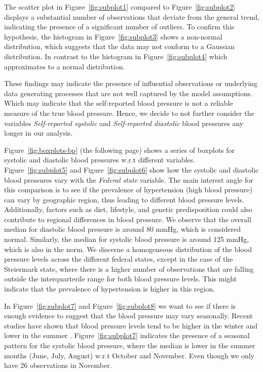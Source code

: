 \documentclass[12 pt]{scrartcl}
\numberwithin{equation}{section}
\begin{document}
The scatter plot in Figure~\ref{fig:subplot1} compared to Figure~\ref{fig:subplot2} displays a substantial number of observations that 
deviate from the general trend, indicating the presence of a significant number of outliers.
To confirm this hypothesis, the histogram in Figure~\ref{fig:subplot3} 
shows a non-normal distribution, which suggests that the data may not conform to a Gaussian distribution. 
In contrast to the histogram in Figure~\ref{fig:subplot4} which approximates to a normal distribution.

These findings may indicate the presence of influential observations or underlying 
data generating processes that are not well captured by the model assumptions. 
Which may indicate that the self-reported blood pressure is not a reliable measure of the true blood pressure.
Hence, we decide to not further consider the variables \textit{Self-reported systolic} and \textit{Self-reported diastolic} blood pressures 
any longer in our analysis.

Figure~\ref{fig:boxplots-bp} (the following page) shows a series of boxplots for systolic and 
diastolic blood pressures w.r.t different variables. 
Figure~\ref{fig:subplot5} and Figure~\ref{fig:subplot6} show how the systolic and diastolic blood pressures vary
with the \textit{Federal state} variable. The main interest angle for this comparison 
is to see if the prevalence of hypertension (high blood pressure) can vary by geographic region, thus
leading to different blood pressure levels. Additionally, factors such as diet, lifestyle, and genetic predisposition 
could also contribute to regional differences in blood pressure. We observe that the overall median for diastolic blood pressure is
around 80 mmHg, which is considered normal. Similarly, the median for systolic blood pressure is around 125 mmHg, 
which is also in the norm. 
We discerne a homogeneous distribution of the blood pressure levels across the different federal states, 
except in the case of the Steiermark state, where there is a higher number of observations that are falling outside the interquarterile range
for both blood pressure levels. This might indicate that the prevalence of hypertension is higher in this region.

In Figure~\ref{fig:subplot7} and Figure~\ref{fig:subplot8} we want to see if there is enough evidence
to suggest that the blood pressure may vary seasonally. Recent studies have shown that blood pressure levels
tend to be higher in the winter and lower in the summer \citep{flint2019effect}.
Figure~\ref{fig:subplot7} indicates the presence of a seasonal pattern for the systolic blood pressure,
where the median is lower in the summer months (June, July, August) w.r.t October and November.
Even though we only have 26 observations in November.
\end{document}
